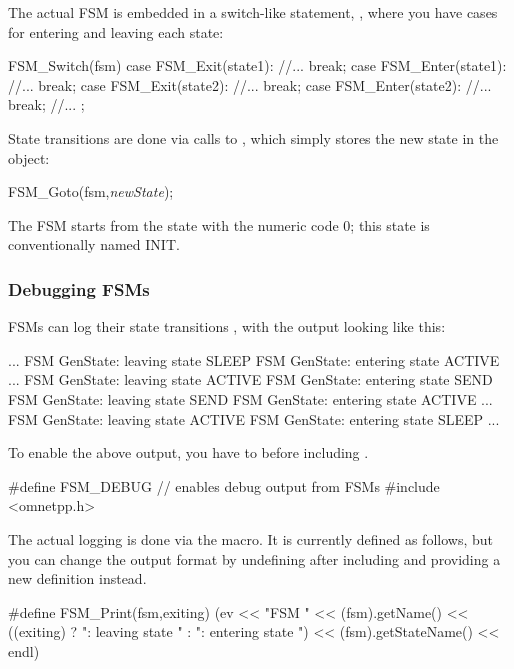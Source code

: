 The actual FSM is embedded in a switch-like statement,
, where you have cases for entering and leaving
each state:


\begin{cpp}
FSM_Switch(fsm)
{
  case FSM_Exit(state1):
    //...
    break;
  case FSM_Enter(state1):
    //...
    break;
  case FSM_Exit(state2):
    //...
    break;
  case FSM_Enter(state2):
    //...
    break;
  //...
};
\end{cpp}


State transitions are done via calls to
, which simply stores the new state in the
 object:

\begin{cpp}
FSM_Goto(fsm,\textit{newState});
\end{cpp}

The FSM starts from the state with the numeric code 0; this state
is conventionally named INIT.


\subsubsection{Debugging FSMs}

FSMs can log their state transitions ,
with the output looking like this:

\begin{filelisting}
...
FSM GenState: leaving state SLEEP
FSM GenState: entering state ACTIVE
...
FSM GenState: leaving state ACTIVE
FSM GenState: entering state SEND
FSM GenState: leaving state SEND
FSM GenState: entering state ACTIVE
...
FSM GenState: leaving state ACTIVE
FSM GenState: entering state SLEEP
...
\end{filelisting}

To enable the above output, you have to 
before including .

\begin{cpp}
#define FSM_DEBUG    // enables debug output from FSMs
#include <omnetpp.h>
\end{cpp}

The actual logging is done via the  macro.
It is currently defined as follows, but you can change the
output format by undefining  after including
 and providing a new definition instead.

\begin{cpp}
#define FSM_Print(fsm,exiting)
  (ev << "FSM " << (fsm).getName()
      << ((exiting) ? ": leaving state " : ": entering state ")
      << (fsm).getStateName() << endl)
\end{cpp}


